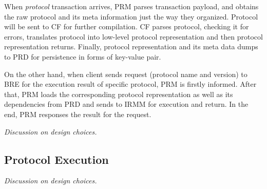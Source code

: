 \documentclass[sigplan,screen]{acmart}
\begin{document}
When \textit{protocol} transaction arrives, PRM parses transaction payload, and
obtains the raw protocol and its meta information just the way they organized.
Protocol will be sent to CF for further compilation. CF parses protocol,
checking it for errors, translates protocol
into low-level protocol representation and then protocol representation returns.
Finally, protocol representation and its meta data dumps to PRD for persistence
in forms of key-value pair.

On the other hand, when client sends request (protocol name and version)
to BRE for the execution result of specific protocol, PRM is firstly informed.
After that, PRM loads the corresponding protocol representation as well as its
dependencies from PRD and sends to IRMM for execution and return.
In the end, PRM responses the result for the request.

\textit{Discussion on design choices.}

\subsection{Protocol Execution}
\textit{Discussion on design choices.}





\end{document}
